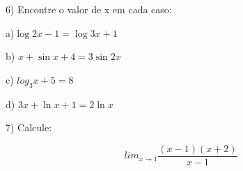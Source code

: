 \documentclass[12pt]{memoir}
\begin{document}
	6) Encontre o valor de x  em cada caso:\par
	
	a)\(\log{2}x - 1 = \log{3}x+1\)\par
	
	b) \(x + \sin x + 4 = 3\sin 2x\)\par
	
	c) \(log_3 {x} + 5 = 8\)\par
	
	d) \(3x + \ln x +1 = 2\ln x\)\par
	
	7) Calcule:
	
	   \[
	   lim_{x\to1}\frac{(x-1)(x + 2)}{x-1}	
	   \]
	
	
	
	
	
	
	
%	
	
	
\end{document}

